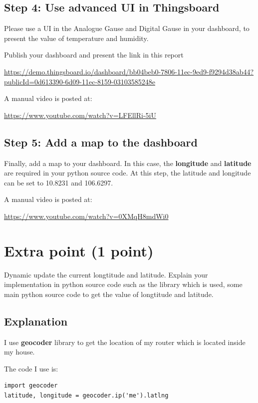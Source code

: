 \documentclass[a4paper,11pt]{article}
\theoremstyle{mytheor}
\begin{document}
\subsection{Step 4: Use advanced UI in Thingsboard}
Please use a UI in the Analogue Gause and Digital Gause in your dashboard, to present the value of temperature and humidity.

Publish your dashboard and present the link in this report
\begin{center}
    \url{https://demo.thingsboard.io/dashboard/bb04beb0-7806-11ec-9ed9-f9294d38ab44?publicId=0d613390-6d09-11ec-8159-03103585248e}
\end{center}

A manual video is posted at:
\begin{center}
    \url{https://www.youtube.com/watch?v=LFEllRi-5iU}
\end{center}

\subsection{Step 5: Add a map to the dashboard}
Finally, add a map to your dashboard. In this case, the \textbf{longitude} and \textbf{latitude} are required in your python source code. At this step, the latitude and longitude can be set to 10.8231 and 106.6297.

A manual video is posted at:
\begin{center}
    \url{https://www.youtube.com/watch?v=0XMqH8mdWi0}
\end{center}

\section{Extra point (1 point)}
Dynamic update the current longtitude and latitude. Explain your implementation in python source code such as the library which is used, some main python source code to get the value of longtitude and latitude.


\subsection{Explanation}
I use \textbf{geocoder} library to get the location of my router which is located inside my house.

The code I use is:

\begin{lstlisting}
import geocoder
latitude, longitude = geocoder.ip('me').latlng
\end{lstlisting}
\end{document}
